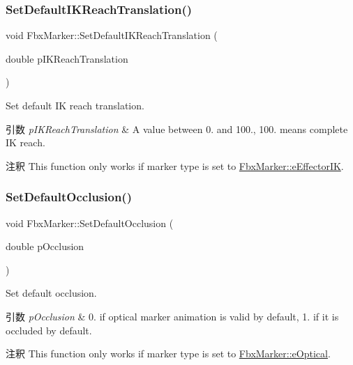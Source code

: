 \subsubsection{\texorpdfstring{Set\+Default\+I\+K\+Reach\+Translation()}{SetDefaultIKReachTranslation()}}
{\footnotesize\ttfamily void Fbx\+Marker\+::\+Set\+Default\+I\+K\+Reach\+Translation (\begin{DoxyParamCaption}\item[{double}]{p\+I\+K\+Reach\+Translation }\end{DoxyParamCaption})}

Set default IK reach translation. 
\begin{DoxyParams}{引数}
{\em p\+I\+K\+Reach\+Translation} & A value between 0. and 100., 100. means complete IK reach. \\
\hline
\end{DoxyParams}
\begin{DoxyRemark}{注釈}
This function only works if marker type is set to \hyperlink{class_fbx_marker_ad1e38753dce9a2212df0364466d9f617a6eb5815d51c3fd66217211a2a4e70538}{Fbx\+Marker\+::e\+Effector\+IK}. 
\end{DoxyRemark}
\mbox{\label{class_fbx_marker_a63161a28a62571c98fd573b95d131de4}} 
\subsubsection{\texorpdfstring{Set\+Default\+Occlusion()}{SetDefaultOcclusion()}}
{\footnotesize\ttfamily void Fbx\+Marker\+::\+Set\+Default\+Occlusion (\begin{DoxyParamCaption}\item[{double}]{p\+Occlusion }\end{DoxyParamCaption})}

Set default occlusion. 
\begin{DoxyParams}{引数}
{\em p\+Occlusion} & 0. if optical marker animation is valid by default, 1. if it is occluded by default. \\
\hline
\end{DoxyParams}
\begin{DoxyRemark}{注釈}
This function only works if marker type is set to \hyperlink{class_fbx_marker_ad1e38753dce9a2212df0364466d9f617abcf28e7d0ad09666bdf9d31f6aa05654}{Fbx\+Marker\+::e\+Optical}. 
\end{DoxyRemark}
\mbox{\label{class_fbx_marker_a4eccced9aa474303db161feadf97ac09}} 
